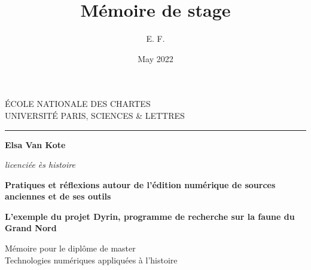\documentclass[a4paper,12pt,twoside]{book}
\title{Mémoire de stage}
\author{E. F.}
\date{May 2022}
\begin{document}
\begin{titlepage}
		\begin{center}
			
			\bigskip
			
			\begin{large}				
				ÉCOLE NATIONALE DES CHARTES\\
				UNIVERSITÉ PARIS, SCIENCES \& LETTRES
			\end{large}
			\begin{center}\rule{2cm}{0.02cm}\end{center}
			
			\bigskip
			\bigskip
			\bigskip
			\begin{Large}
				\textbf{Elsa Van Kote}\\
			\end{Large}
			\begin{normalsize} \textit{licenciée ès histoire}\\
			\end{normalsize}
			
			\bigskip
			\bigskip
			\bigskip
			
			\begin{Huge}
				\textbf{Pratiques et réflexions autour de l'édition numérique de sources anciennes et de ses outils}\\
			\end{Huge}
			\bigskip
			\bigskip
			\begin{LARGE}
				\textbf{L'exemple du projet Dyrin, programme de recherche sur la faune du Grand Nord}\\
			\end{LARGE}
			
			\bigskip
			\bigskip
			\bigskip
			\begin{large}
			\end{large}
			\vfill
			
			\begin{large}
				Mémoire 
				pour le diplôme de master \\
				\og{} Technologies numériques appliquées à l'histoire \fg{} \\
			\end{large}
			
		\end{center}
	\end{titlepage}

	\thispagestyle{empty}	
	\cleardoublepage
	
	\frontmatter
\end{document}
